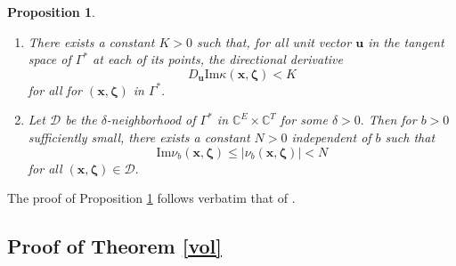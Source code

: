 \documentclass[11pt]{article}
\newtheorem{proposition}[theorem]{Proposition}
\theoremstyle{remark}
\theoremstyle{remark}
\numberwithin{equation}{section}
\begin{document}
\begin{proposition}\label{bound2} 

\begin{enumerate}[(1)]
\item  There exists a constant $K>0$ such that, for all unit vector 
$\mathbf u$ in  the tangent space of $\Gamma^*$ at each of its points, 
 the directional derivative 
$$D_{\mathbf u}\mathrm{Im}\kappa(\boldsymbol x,\boldsymbol \zeta)<K$$
for all for $(\boldsymbol x,\boldsymbol \zeta)$ in $\Gamma^*.$



\item Let $\mathcal D$ be the $\delta$-neighborhood of $\Gamma^*$ in $\mathbb C^E\times \mathbb C^T$ for some $\delta>0.$ Then for $b>0$ sufficiently small,  there exists a constant $N>0$ independent of $b$ such that 
$$\mathrm{Im}\mathcal \nu_b(\boldsymbol x, \boldsymbol \zeta)\leqslant \big|\nu_b(\boldsymbol x, \boldsymbol \zeta)\big|<N$$
for all $(\boldsymbol x,\boldsymbol \zeta)\in  \mathcal  D.$  
\end{enumerate}
\end{proposition}







The proof of Proposition \ref{bound2} follows verbatim that of \cite[Proposition 5.7 and Proposition 5.8]{LMSWY}. 


\subsection{Proof of Theorem \ref{vol}}
\end{document}
